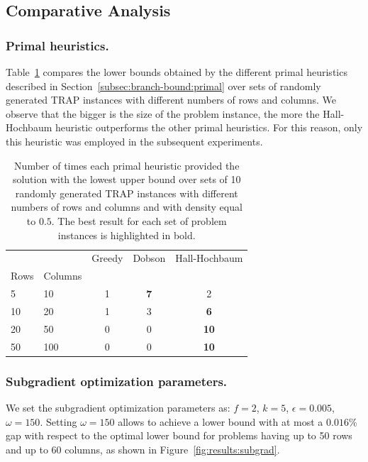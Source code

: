 \documentclass[runningheads]{llncs}
\begin{document}
\subsection{Comparative Analysis}
\label{subsec:results:comparisons}

\subsubsection{Primal heuristics.} Table~\ref{tab:results:primal} compares the lower bounds obtained by the different primal heuristics described in Section~\ref{subsec:branch-bound:primal} over sets of randomly generated TRAP instances with different numbers of rows and columns. We observe that the bigger is the size of the problem instance, the more the Hall-Hochbaum heuristic outperforms the other primal heuristics. For this reason, only this heuristic was employed in the subsequent experiments. 

\begin{table}
  \caption{Number of times each primal heuristic provided the solution with the lowest upper bound over sets of 10 randomly generated TRAP instances with different numbers of rows and columns and with density equal to $0.5$. The best result for each set of problem instances is highlighted in bold.}
  \label{tab:results:primal}
  \centering
  \begin{tabular}{llccc}
    \toprule
     &  & Greedy & Dobson & Hall-Hochbaum \\
    Rows & Columns &  &  &  \\
    \midrule
    5 & 10 & 1 & \bfseries 7 & 2 \\
    10 & 20 & 1 & 3 & \bfseries 6 \\
    20 & 50 & 0 & 0 & \bfseries 10 \\
    50 & 100 & 0 & 0 & \bfseries 10 \\
    \bottomrule
    \end{tabular}
  \end{table}

\subsubsection{Subgradient optimization parameters.} We set the subgradient optimization parameters as: $f=2$, $k=5$, $\epsilon=0.005$, $\omega=150$. Setting $\omega=150$ allows to achieve a lower bound with at most a $0.016\%$ gap with respect to the optimal lower bound for problems having up to 50 rows and up to 60 columns, as shown in Figure~\ref{fig:results:subgrad}.
\end{document}
